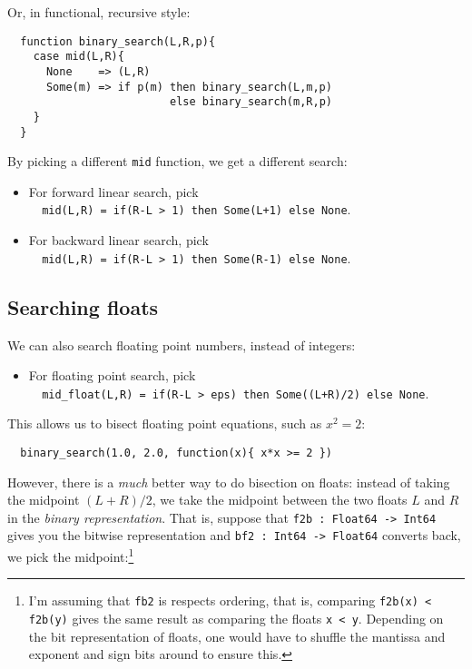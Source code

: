 \documentclass[a4paper, 11pt]{article}
\begin{document}
\noindent Or, in functional, recursive style:

\begin{lstlisting}
  function binary_search(L,R,p){
    case mid(L,R){
      None    => (L,R)
      Some(m) => if p(m) then binary_search(L,m,p)
                         else binary_search(m,R,p)
    }
  }
\end{lstlisting}

\noindent By picking a different \lstinline|mid| function, we get a different search:
\begin{itemize}
  \item For forward linear search, pick \\ \lstinline|  mid(L,R) = if(R-L > 1) then Some(L+1) else None|.
  \item For backward linear search, pick \\ \lstinline|  mid(L,R) = if(R-L > 1) then Some(R-1) else None|.
\end{itemize}

\subsection{Searching floats}

\noindent We can also search floating point numbers, instead of integers:
\begin{itemize}
  \item For floating point search, pick \\ \lstinline|  mid_float(L,R) = if(R-L > eps) then Some((L+R)/2) else None|.
\end{itemize}

\noindent This allows us to bisect floating point equations, such as $x^2 = 2$:

\begin{lstlisting}
  binary_search(1.0, 2.0, function(x){ x*x >= 2 })
\end{lstlisting}

\noindent However, there is a \emph{much} better way to do bisection on floats: instead of taking the midpoint $(L+R)/2$, we take the midpoint between the two floats $L$ and $R$ in the \emph{binary representation}. That is, suppose that \lstinline|f2b : Float64 -> Int64| gives you the bitwise representation and \lstinline|bf2 : Int64 -> Float64| converts back, we pick the midpoint:\footnote{I'm assuming that \lstinline|fb2| is respects ordering, that is, comparing \lstinline|f2b(x) < f2b(y)| gives the same result as comparing the floats \lstinline|x < y|. Depending on the bit representation of floats, one would have to shuffle the mantissa and exponent and sign bits around to ensure this.}
\end{document}
